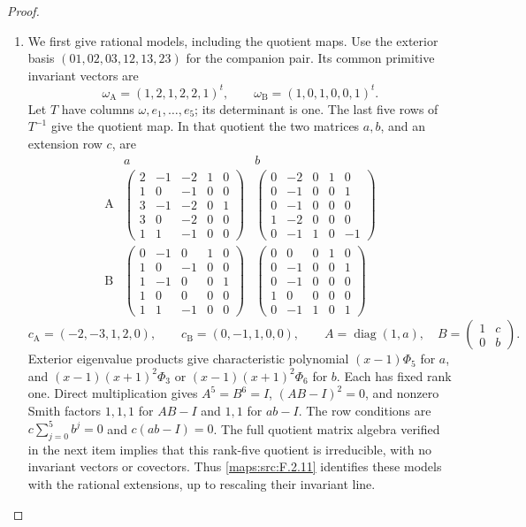 \begin{proof}
\begin{enumerate}[label={$\langle1\rangle$\arabic*.}]
\item We first give rational models, including the quotient
maps.  Use the exterior basis $(01,02,03,12,13,23)$ for the companion
pair.  Its common primitive invariant vectors are
\[
 \omega_{\mathrm A}=(1,2,1,2,2,1)^t,\qquad
 \omega_{\mathrm B}=(1,0,1,0,0,1)^t.
\]
Let $T$ have columns $\omega,e_1,\ldots,e_5$; its determinant is one.
The last five rows of $T^{-1}$ give the quotient map.  In that
quotient the two matrices $a,b$, and an extension row $c$, are
\[
\begin{array}{c|c|c}
 &a&b\\\hline
\mathrm A&
\begin{pmatrix}2&-1&-2&1&0\\1&0&-1&0&0\\3&-1&-2&0&1\\
3&0&-2&0&0\\1&1&-1&0&0\end{pmatrix}&
\begin{pmatrix}0&-2&0&1&0\\0&-1&0&0&1\\0&-1&0&0&0\\
1&-2&0&0&0\\0&-1&1&0&-1\end{pmatrix}\\[3pt]
\mathrm B&
\begin{pmatrix}0&-1&0&1&0\\1&0&-1&0&0\\1&-1&0&0&1\\
1&0&0&0&0\\1&1&-1&0&0\end{pmatrix}&
\begin{pmatrix}0&0&0&1&0\\0&-1&0&0&1\\0&-1&0&0&0\\
1&0&0&0&0\\0&-1&1&0&1\end{pmatrix}
\end{array}
\]
\[
 c_{\mathrm A}=(-2,-3,1,2,0),\qquad
 c_{\mathrm B}=(0,-1,1,0,0),\qquad
 A=\operatorname{diag}(1,a),\quad
 B=\begin{pmatrix}1&c\\0&b\end{pmatrix}.
\]
Exterior eigenvalue products give characteristic polynomial
$(x-1)\Phi _5$ for $a$, and $(x-1)(x+1)^2\Phi _3$ or
$(x-1)(x+1)^2\Phi _6$ for $b$.  Each has fixed rank one.
Direct multiplication gives $A^5=B^6=I$, $(AB-I)^2=0$, and
nonzero Smith factors $1,1,1$ for $AB-I$ and $1,1$ for $ab-I$.
The row conditions are $c\sum_{j=0}^5b^j=0$ and $c(ab-I)=0$.
The full quotient matrix algebra verified in the next item implies
that this rank-five quotient is irreducible, with no invariant
vectors or covectors.  Thus \cref{maps:src:F.2.11} identifies these
models with the rational extensions, up to rescaling
their invariant line.


\end{enumerate}
\end{proof}
